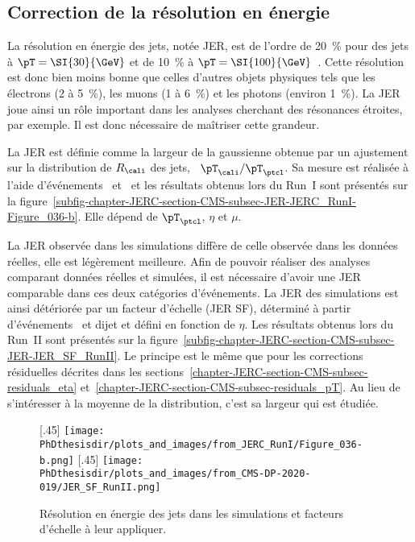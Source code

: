 \subsection{Correction de la résolution en énergie}\label{chapter-JERC-section-CMS-subsec-JER}
La résolution en énergie des jets, notée JER, est de l'ordre de \SI{20}{\%} pour des jets à $\pT=\SI{30}{\GeV}$ et de \SI{10}{\%} à $\pT=\SI{100}{\GeV}$~\cite{JERC_RunI}.
Cette résolution est donc bien moins bonne que celles d'autres objets physiques tels que les électrons (\num{2} à \SI{5}{\%}), les muons (\num{1} à \SI{6}{\%}) et les photons (environ \SI{1}{\%}).
La JER joue ainsi un rôle important dans les analyses cherchant des résonances étroites, par exemple.
Il est donc nécessaire de maîtriser cette grandeur.
\par La JER est définie comme la largeur de la gaussienne obtenue par un ajustement sur la distribution de $R_\cali$ des jets, \ie\ $\pT_\cali/\pT_\ptcl$.
Sa mesure est réalisée à l'aide d'événements \Gjets\ et \Zjets\ et les résultats obtenus lors du Run~I sont présentés sur la figure~\ref{subfig-chapter-JERC-section-CMS-subsec-JER-JERC_RunI-Figure_036-b}.
Elle dépend de $\pT_\ptcl$, $\eta$ et $\mu$.
\par La JER observée dans les simulations diffère de celle observée dans les données réelles, elle est légèrement meilleure.
Afin de pouvoir réaliser des analyses comparant données réelles et simulées, il est nécessaire d'avoir une JER comparable dans ces deux catégories d'événements.
La JER des simulations est ainsi détériorée par un facteur d'échelle (JER SF), déterminé à partir d'événements \Gjets\ et dijet et défini en fonction de $\eta$.
Les résultats obtenus lors du Run~II sont présentés sur la figure~\ref{subfig-chapter-JERC-section-CMS-subsec-JER-JER_SF_RunII}.
Le principe est le même que pour les corrections résiduelles décrites dans les sections~\ref{chapter-JERC-section-CMS-subsec-residuals_eta} et~\ref{chapter-JERC-section-CMS-subsec-residuals_pT}. Au lieu de s'intéresser à la moyenne de la distribution, c'est sa largeur qui est étudiée.
\begin{figure}[h]
\centering
{}[.45\textwidth]
{\texttt{[image: \\PhDthesisdir/plots\_and\_images/from\_JERC\_RunI/Figure\_036-b.png]}}
\hfill
{}[.45\textwidth]
{\texttt{[image: \\PhDthesisdir/plots\_and\_images/from\_CMS-DP-2020-019/JER\_SF\_RunII.png]}}
\caption[Résolution en énergie des jets.]{Résolution en énergie des jets dans les simulations et facteurs d'échelle à leur appliquer.}
\label{fig-chapter-JERC-section-CMS-subsec-JER}
\end{figure}
